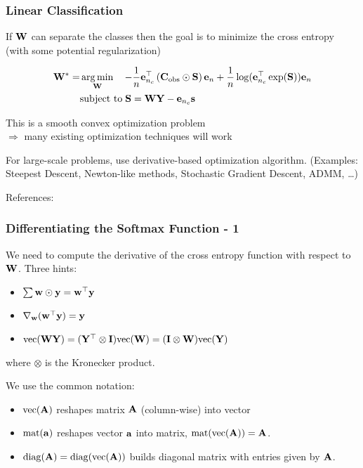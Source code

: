 \documentclass[12pt,fleqn,handout]{beamer}
\begin{document}
\begin{frame}\frametitle{Linear Classification}

If ${\bf W}$ can separate the classes then the goal is to minimize the cross entropy (with some potential regularization)

\begin{align*}
 {\bf W}^* = & \operatorname*{arg\,min}_{{\bf W}} \quad - \frac{1}{n}{\bf e}_{n_c}^{\top} \left( {\bf C}_{\rm obs} \odot {\bf S}\right) {\bf e}_{n} 
+ \frac{1}{n} \log({\bf e}_{n_c}^\top \exp({\bf S})){\bf e}_n \\
          & \text{subject to} \;{\bf S} = {\bf W} {\bf Y} - {\bf e}_{n_c} {\bf s}
\end{align*}
\pause

This is a smooth convex optimization problem \\ $\Rightarrow$ many existing optimization techniques will work

\bigskip

For large-scale problems, use derivative-based optimization algorithm. (Examples: Steepest Descent, Newton-like methods,  Stochastic Gradient Descent, ADMM, \ldots)

\bigskip

References: \cite{NocedalWright2006,BoydVandenberghe2004,Beck2014,WuFungEtAl2019SoftmaxADMM}
\end{frame}

 \begin{frame}\frametitle{Differentiating the Softmax Function - 1}

We need to compute the derivative of the cross entropy function with respect to ${\bf W}$.
Three hints:
\begin{itemize}
\item $\sum {\bf w} \odot {\bf y} = {\bf w}^{\top} {\bf y} $
\item $\nabla_{{\bf w}} ({\bf w}^{\top} {\bf y}) = {\bf y}$
\item ${\rm vec} ({\bf W} {\bf Y}) = ({\bf Y}^\top \otimes {\bf I}) {\rm vec} ({\bf W}) = ({\bf I} \otimes {\bf W}) {\rm vec}({\bf Y})$
\end{itemize}
where $\otimes$ is the Kronecker product.

\bigskip



We use the common notation:
\begin{itemize}
	\item ${\rm vec}({\bf A})$ reshapes matrix ${\bf A}$ (column-wise) into vector
	\item ${\rm mat}({\bf a})$ reshapes vector ${\bf a}$ into matrix, ${\rm mat}({\rm vec}({\bf A})) = {\bf A}$.
	\item ${\rm diag}({\bf A}) = {\rm diag}({\rm vec}( {\bf A}))$ builds diagonal matrix with entries given by ${\bf A}$. 
\end{itemize}


\end{frame}
\end{document}
